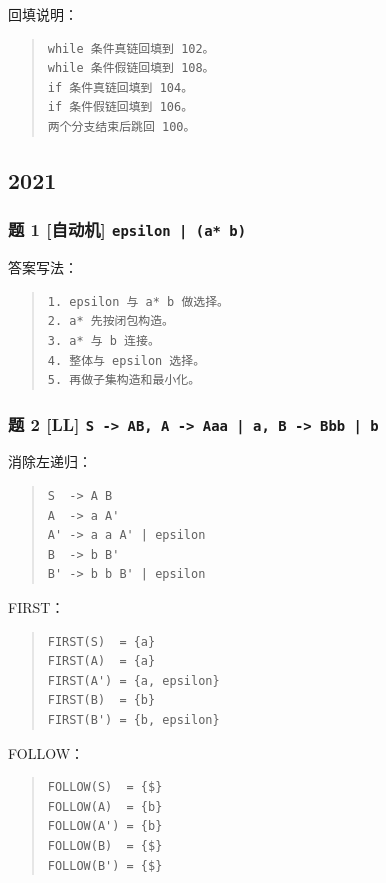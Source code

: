 \documentclass[UTF8,zihao=-4]{ctexart}
\begin{document}
回填说明：


\begin{quote}
\footnotesize
\begin{verbatim}
while 条件真链回填到 102。
while 条件假链回填到 108。
if 条件真链回填到 104。
if 条件假链回填到 106。
两个分支结束后跳回 100。
\end{verbatim}
\end{quote}


\subsection{2021}


\subsubsection{题 1 [自动机] \texttt{epsilon | (a* b)}}


答案写法：


\begin{quote}
\footnotesize
\begin{verbatim}
1. epsilon 与 a* b 做选择。
2. a* 先按闭包构造。
3. a* 与 b 连接。
4. 整体与 epsilon 选择。
5. 再做子集构造和最小化。
\end{verbatim}
\end{quote}


\subsubsection{题 2 [LL] \texttt{S -> AB, A -> Aaa | a, B -> Bbb | b}}


消除左递归：


\begin{quote}
\footnotesize
\begin{verbatim}
S  -> A B
A  -> a A'
A' -> a a A' | epsilon
B  -> b B'
B' -> b b B' | epsilon
\end{verbatim}
\end{quote}


FIRST：


\begin{quote}
\footnotesize
\begin{verbatim}
FIRST(S)  = {a}
FIRST(A)  = {a}
FIRST(A') = {a, epsilon}
FIRST(B)  = {b}
FIRST(B') = {b, epsilon}
\end{verbatim}
\end{quote}


FOLLOW：


\begin{quote}
\footnotesize
\begin{verbatim}
FOLLOW(S)  = {$}
FOLLOW(A)  = {b}
FOLLOW(A') = {b}
FOLLOW(B)  = {$}
FOLLOW(B') = {$}
\end{verbatim}
\end{quote}
\end{document}
